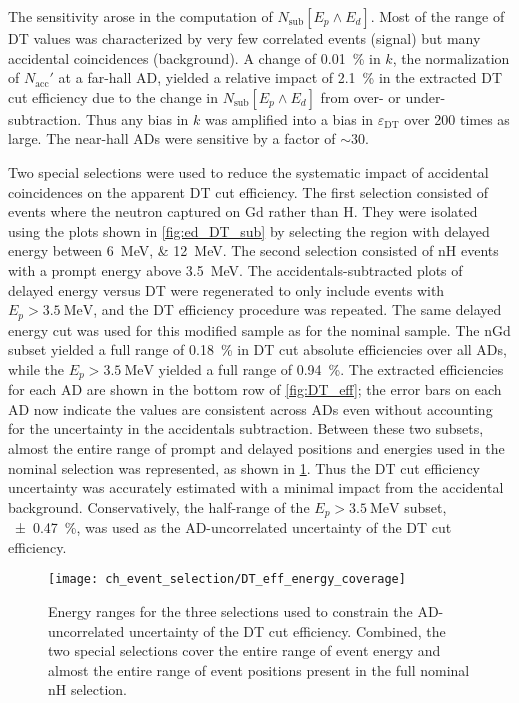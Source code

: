 The sensitivity arose in the computation of $N_\text{sub}[E_p \wedge E_d]$.
Most of the range of DT values was characterized by
very few correlated events (signal) but many accidental coincidences (background).
A change of \SI{0.01}{\percent} in $k$, the normalization
of $N_\text{acc}'$ at a far-hall AD,
yielded a relative impact of \SI{2.1}{\percent} in the extracted DT cut efficiency
due to the change in $N_\text{sub}[E_p \wedge E_d]$
from over- or under-subtraction.
Thus any bias in $k$ was amplified into a bias in $\varepsilon_\text{DT}$
over 200 times as large.
The near-hall ADs were sensitive by a factor of ${\sim}30$.

Two special selections were used to reduce the systematic impact of accidental coincidences
on the apparent DT cut efficiency.
The first selection consisted of events where the neutron captured on Gd
rather than H.
They were isolated using the plots shown in \cref{fig:ed_DT_sub}
by selecting the region with delayed energy between \SIlist{6;12}{\MeV}.
The second selection consisted of nH events
with a prompt energy above \SI{3.5}{\MeV}.
The accidentals-subtracted plots of delayed energy versus DT were
regenerated to only include events with $E_p > \SI{3.5}{\MeV}$,
and the DT efficiency procedure was repeated.
The same delayed energy cut was used for this modified sample
as for the nominal sample.
The nGd subset yielded a full range of \SI{0.18}{\percent}
in DT cut absolute efficiencies over all ADs,
while the $E_p > \SI{3.5}{\MeV}$ yielded a full range of \SI{0.94}{\percent}.
The extracted efficiencies for each AD are shown in
the bottom row of \cref{fig:DT_eff};
the error bars on each AD now indicate the values are consistent across ADs
even without accounting for the uncertainty in the accidentals subtraction.
Between these two subsets, almost the entire range
of prompt and delayed positions and energies used in the nominal selection was represented,
as shown in \cref{fig:DT_energy_range}.
Thus the DT cut efficiency uncertainty was accurately estimated
with a minimal impact from the accidental background.
Conservatively, the half-range of the $E_p > \SI{3.5}{\MeV}$ subset,
\SI{\pm0.47}{\percent}, was
used as the AD-uncorrelated uncertainty of the DT cut efficiency.

\begin{figure}
    \centering
    \texttt{[image: ch\_event\_selection/DT\_eff\_energy\_coverage]}
    \caption[DT efficiency study energy coverage]{
        Energy ranges for the three selections used to constrain
        the AD-uncorrelated uncertainty of the DT cut efficiency.
        Combined, the two special selections cover the entire range of event energy
        and almost the entire range of event positions
        present in the full nominal nH selection.
    }
    \label{fig:DT_energy_range}
\end{figure}

